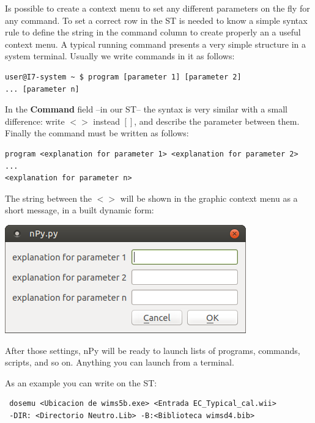 \documentclass[a4paper,10pt]{article}
\begin{document}
Is possible to create a context menu to set any different parameters on the fly for any command. To set a correct row in the ST is needed to know a simple syntax rule to define the string in the command column to create properly an a useful context menu. A typical running command presents a very simple structure in a system terminal. Usually we write commands in it as follows:

\begin{verbatim}
user@I7-system ~ $ program [parameter 1] [parameter 2] 
... [parameter n]
\end{verbatim}

In the \textbf{Command} field --in our ST-- the syntax is very similar with a small difference: write $< >$ instead $[]$, and describe the parameter between them. Finally the command must be written as follows:

\begin{verbatim}
program <explanation for parameter 1> <explanation for parameter 2> 
... 
<explanation for parameter n>
 \end{verbatim}

The string between the $< >$ will be shown in the graphic context menu as a short message, in a built dynamic form: 
\begin{center}
 \includegraphics[width=\textwidth]{img/contextMenuExampleString.png}
\end{center}

\bigskip 

After those settings, nPy will be ready to launch lists of programs, commands, scripts, and so on. Anything you can launch from a terminal.

\bigskip 

\noindent As an example you can write on the ST:
\begin{verbatim}
 dosemu <Ubicacion de wims5b.exe> <Entrada EC_Typical_cal.wii> 
 -DIR: <Directorio Neutro.Lib> -B:<Biblioteca wimsd4.bib>
 \end{verbatim}
 
\end{document}
